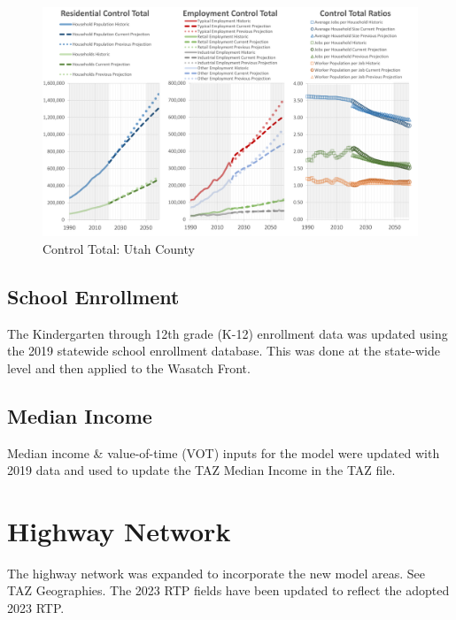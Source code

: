 \documentclass[
  letterpaper,
  DIV=11,
  numbers=noendperiod]{scrreprt}
\begin{document}
\begin{figure}[H]

{\centering \includegraphics{v9x/v900/whats-new/_pictures/pdf-control-utah.png}

}

\caption{\label{fig-pdf-control-utah}Control Total: Utah County}

\end{figure}

\hypertarget{school-enrollment}{%
\subsection{School Enrollment}\label{school-enrollment}}

The Kindergarten through 12th grade (K-12) enrollment data was updated
using the 2019 statewide school enrollment database. This was done at
the state-wide level and then applied to the Wasatch Front.

\hypertarget{median-income}{%
\subsection{Median Income}\label{median-income}}

Median income \& value-of-time (VOT) inputs for the model were updated
with 2019 data and used to update the TAZ Median Income in the TAZ file.

\hypertarget{highway-network}{%
\section{Highway Network}\label{highway-network}}

The highway network was expanded to incorporate the new model areas. See
TAZ Geographies. The 2023 RTP fields have been updated to reflect the
adopted 2023 RTP.
\end{document}
